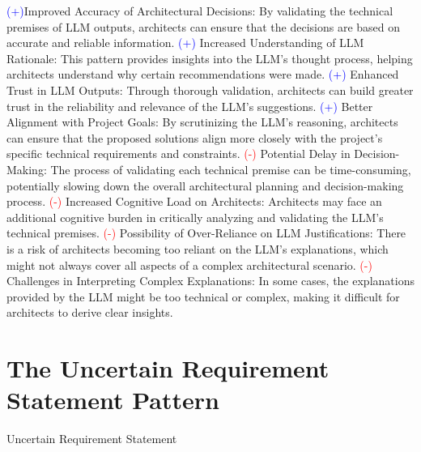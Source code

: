 \newline
\textcolor{blue}{(+)}Improved Accuracy of Architectural Decisions: By validating the technical premises of LLM outputs, architects can ensure that the decisions are based on accurate and reliable information. \newline
\textcolor{blue}{(+)} Increased Understanding of LLM Rationale: This pattern provides insights into the LLM's thought process, helping architects understand why certain recommendations were made. \newline
\textcolor{blue}{(+)} Enhanced Trust in LLM Outputs: Through thorough validation, architects can build greater trust in the reliability and relevance of the LLM's suggestions. \newline
\textcolor{blue}{(+)} Better Alignment with Project Goals: By scrutinizing the LLM's reasoning, architects can ensure that the proposed solutions align more closely with the project's specific technical requirements and constraints. \newline
\textcolor{red}{(-)} Potential Delay in Decision-Making: The process of validating each technical premise can be time-consuming, potentially slowing down the overall architectural planning and decision-making process. \newline
\textcolor{red}{(-)} Increased Cognitive Load on Architects: Architects may face an additional cognitive burden in critically analyzing and validating the LLM's technical premises.\newline
\textcolor{red}{(-)} Possibility of Over-Reliance on LLM Justifications: There is a risk of architects becoming too reliant on the LLM’s explanations, which might not always cover all aspects of a complex architectural scenario. \newline
\textcolor{red}{(-)} Challenges in Interpreting Complex Explanations: In some cases, the explanations provided by the LLM might be too technical or complex, making it difficult for architects to derive clear insights. \newline



\section{The Uncertain Requirement Statement Pattern} \label{sec:uncertain-requirement-statement}

 Uncertain Requirement Statement

